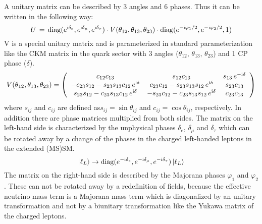 A unitary matrix can be described by 3 angles and 6 phases. Thus it can be
written in the following way:
\begin{equation}
 U 
 \,=\,
 \operatorname{diag}(e^{\mathrm{i}\delta_{e}},e^{\mathrm{i}\delta_{\mu}},e^{\mathrm{i}\delta_{\tau}}) \cdot V({ \theta_{12}},{ \theta_{13}},{\theta_{23}}) \cdot 
 \operatorname{diag}(e^{-\mathrm{i}\varphi_1/2},e^{-\mathrm{i}\varphi_2/2},1)
\end{equation}
V is a special unitary matrix and is parameterized in standard parameterization like the CKM
matrix in the quark sector with 3 angles ($\theta_{12},\,\theta_{13},\,\theta_{23}$) and 1 CP phase ($\delta$).
\begin{equation}
 V({ \theta_{12}},{ \theta_{13}},{\theta_{23}})=\left(
 \begin{array}{ccc}
 { c_{12}}{ c_{13}} & { s_{12}}{ c_{13}} & { s_{13}}
 \,e^{-\mathrm{i}{ \delta}}\\
 -{  c_{23}}{ s_{12}}-{  s_{23}}{ s_{13}}{ c_{12}}
 \,e^{\mathrm{i}{ \delta}} & {  c_{23}}{ c_{12}}-{  s_{23}}{ s_{13}}
 { s_{12}}\,e^{\mathrm{i}{ \delta}} & {  s_{23}}{ c_{13}}\\
 {  s_{23}}{ s_{12}}-{  c_{23}}{ s_{13}}{ c_{12}}
 \,e^{\mathrm{i}{ \delta}} & -{  s_{23}}{ c_{12}}-{  c_{23}}{ s_{13}}
 { s_{12}}\,e^{\mathrm{i}{ \delta}} & {  c_{23}}{ c_{13}}
 \end{array}
 \right)
\label{eq:DefV}
\end{equation}
where $s_{ij}$ and $c_{ij}$ are defined as$s_{ij}=\sin\theta_{ij}$ and
$c_{ij}=\cos\theta_{ij}$, respectively.
In addition there are phase matrices multiplied from both sides. The matrix on
the left-hand side is characterized by the unphysical phases
$\delta_e$, $\delta_\mu$ and $\delta_\tau$ which can be rotated away by a change of
the phases in the charged left-handed leptons in the extended (MS)SM.
\begin{equation}
\ket{\ell_L}\rightarrow
\operatorname{diag}(e^{-\mathrm{i}\delta_{e}},e^{-\mathrm{i}\delta_{\mu}},e^{-\mathrm{i}\delta_{\tau}}) \ket{\ell_L}
\end{equation}
The matrix on the right-hand side is described by the Majorana phases
$\varphi_1$ and $\varphi_2$. These can not be rotated away by a redefinition of
fields, because the effective neutrino mass term is a Majorana mass term which is
diagonalized by an unitary transformation and not by a biunitary transformation
like the Yukawa matrix of the charged leptons.


